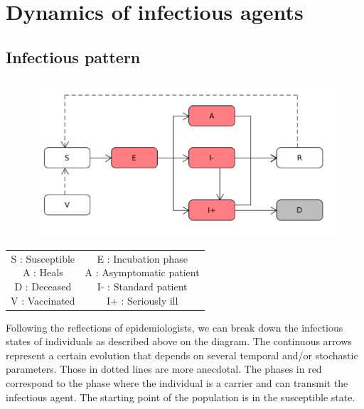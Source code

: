 \chapter{Dynamics of infectious agents}

\section{Infectious pattern}

\begin{figure}[h]
  \centering
  \includegraphics[width=\linewidth]{Media/SchemaInfection.png}
  \caption{}
  \label{fig:schemainfection}
\end{figure}

\begin{tabular}{cc}
\parbox{0.5\linewidth}{S : Susceptible\\
A : Heals\\
D : Deceased\\
V : Vaccinated\\}
&
\parbox{0.5\linewidth}{E : Incubation phase\\
A : Asymptomatic patient\\
I- : Standard patient\\
I+ : Seriously ill\\}
\end{tabular}

\bigskip

Following the reflections of epidemiologists, we can break down the infectious  states of individuals as described above on the diagram. The continuous arrows represent a certain evolution that depends on several temporal and/or stochastic parameters. Those in dotted lines are more anecdotal. The phases in red correspond to the phase where the individual is a carrier and can transmit the infectious agent. The starting point of the population is in the susceptible state.\\

